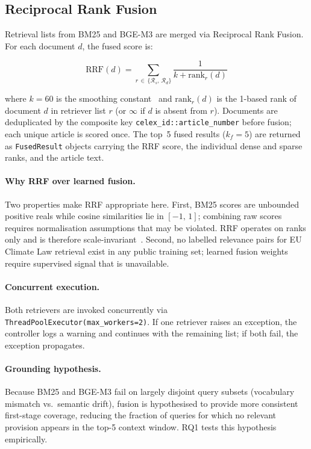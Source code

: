 \documentclass{iosart2x}
\newcommand{\bgem}{BGE-M3\xspace}
\newcommand{\rrf}{RRF\xspace}
\begin{document}
\subsection{Reciprocal Rank Fusion}
\label{sec:rrf}

Retrieval lists from BM25 and \bgem are merged via Reciprocal Rank
Fusion.  For each document $d$, the fused score is:

\begin{equation}
  \label{eq:rrf}
  \mathrm{RRF}(d) = \sum_{r \,\in\, \{\mathcal{R}_s,\, \mathcal{R}_d\}}
    \frac{1}{k + \mathrm{rank}_r(d)}
\end{equation}

\noindent where $k{=}60$ is the smoothing constant~\cite{cormack2009rrf}
and $\mathrm{rank}_r(d)$ is the 1-based rank of document $d$ in
retriever list $r$ (or $\infty$ if $d$ is absent from $r$).  Documents
are deduplicated by the composite key
\texttt{celex\_id::article\_number} before fusion; each unique article
is scored once.  The top~5 fused results ($k_f{=}5$) are returned as
\texttt{FusedResult} objects carrying the RRF score, the individual
dense and sparse ranks, and the article text.

\paragraph{Why RRF over learned fusion.}  Two properties make \rrf
appropriate here.  First, BM25 scores are unbounded positive reals
while cosine similarities lie in $[-1,\,1]$; combining raw scores
requires normalisation assumptions that may be violated.  \rrf
operates on ranks only and is therefore scale-invariant~\cite{cormack2009rrf}.
Second, no labelled relevance pairs for EU Climate Law retrieval exist
in any public training set; learned fusion weights require supervised
signal that is unavailable.

\paragraph{Concurrent execution.}  Both retrievers are invoked
concurrently via \texttt{ThreadPoolExecutor(max\_workers=2)}.  If one
retriever raises an exception, the controller logs a warning and
continues with the remaining list; if both fail, the exception
propagates.

\paragraph{Grounding hypothesis.}  Because BM25 and \bgem fail on
largely disjoint query subsets (vocabulary mismatch vs.\ semantic
drift), fusion is hypothesised to provide more consistent first-stage
coverage, reducing the fraction of queries for which no relevant
provision appears in the top-5 context window.  RQ1 tests this
hypothesis empirically.
\end{document}
